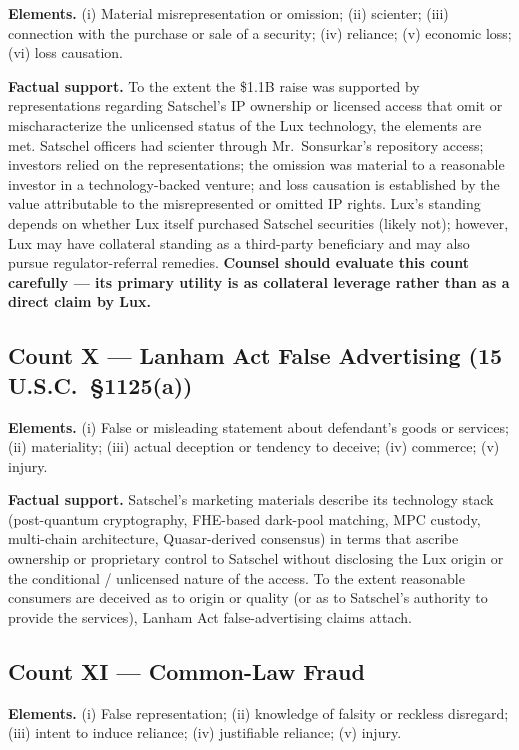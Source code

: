 \documentclass[11pt,letterpaper]{article}
\begin{document}
\textbf{Elements.} (i) Material misrepresentation or omission; (ii)
scienter; (iii) connection with the purchase or sale of a security;
(iv) reliance; (v) economic loss; (vi) loss causation.

\textbf{Factual support.} To the extent the \$1.1B raise was supported
by representations regarding Satschel's IP ownership or licensed
access that omit or mischaracterize the unlicensed status of the Lux
technology, the elements are met. Satschel officers had scienter
through Mr.\ Sonsurkar's repository access; investors relied on
the representations; the omission was material to a reasonable investor
in a technology-backed venture; and loss causation is established by
the value attributable to the misrepresented or omitted IP rights.
Lux's standing depends on whether Lux itself purchased Satschel
securities (likely not); however, Lux may have collateral standing as
a third-party beneficiary and may also pursue regulator-referral
remedies. \textbf{Counsel should evaluate this count carefully ---
its primary utility is as collateral leverage rather than as a
direct claim by Lux.}

\subsection*{Count X --- Lanham Act False Advertising (15 U.S.C.\
\S 1125(a))}

\textbf{Elements.} (i) False or misleading statement about defendant's
goods or services; (ii) materiality; (iii) actual deception or
tendency to deceive; (iv) commerce; (v) injury.

\textbf{Factual support.} Satschel's marketing materials describe its
technology stack (post-quantum cryptography, FHE-based dark-pool
matching, MPC custody, multi-chain architecture, Quasar-derived
consensus) in terms that ascribe ownership or proprietary control to
Satschel without disclosing the Lux origin or the conditional /
unlicensed nature of the access. To the extent reasonable consumers
are deceived as to origin or quality (or as to Satschel's authority
to provide the services), Lanham Act false-advertising claims attach.

\subsection*{Count XI --- Common-Law Fraud}

\textbf{Elements.} (i) False representation; (ii) knowledge of falsity
or reckless disregard; (iii) intent to induce reliance; (iv)
justifiable reliance; (v) injury.
\end{document}
